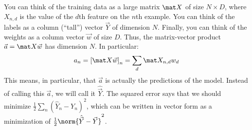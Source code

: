 You can think of the training data as a large matrix $\mat X$ of size
$N \times D$, where $X_{n,d}$ is the value of the $d$th feature on the
$n$th example.  You can think of the labels as a column (``tall'')
vector $\vec Y$ of dimension $N$.  Finally, you can think of the
weights as a column vector $\vec w$ of size $D$.  Thus, the
matrix-vector product $\vec a = \mat X \vec w$ has dimension $N$.  In
particular:
%
\begin{equation}
a_n
= \left[ \mat X \vec w \right]_n
= \sum_d \mat X_{n,d} w_d
\end{equation}
%
This means, in particular, that $\vec a$ is actually the predictions
of the model.  Instead of calling this $\vec a$, we will call it
$\hat{\vec Y}$.  The squared error says that we should minimize $\frac 1
2 \sum_n (\hat Y_n - Y_n)^2$, which can be written in vector form as a
minimization of $\frac 1 2 \norm{\hat{\vec Y} - \vec Y}^2$.


